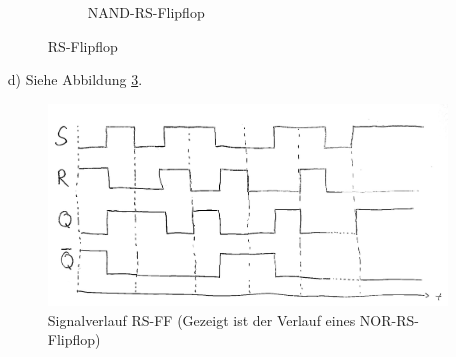 \documentclass{article}
\begin{document}
\begin{enumerate}
\begin{figure}[h]
\begin{subfigure}[b]{0.5\linewidth}
				\caption{NAND-RS-Flipflop}
				\label{f:nand_rs}
			\end{subfigure}
			\caption{RS-Flipflop}
			\label{f:rs_flipflop}
		\end{figure}
		\item[d)] Siehe Abbildung \ref{f:signal_rs}.
		\begin{figure}[h]
			\centering
			\includegraphics[width=\linewidth]{signalverlauf_rs.jpeg}
			\caption{Signalverlauf RS-FF (Gezeigt ist der Verlauf eines NOR-RS-Flipflop)}
			\label{f:signal_rs}
		\end{figure}
	\end{enumerate}
	\FloatBarrier
\end{document}
